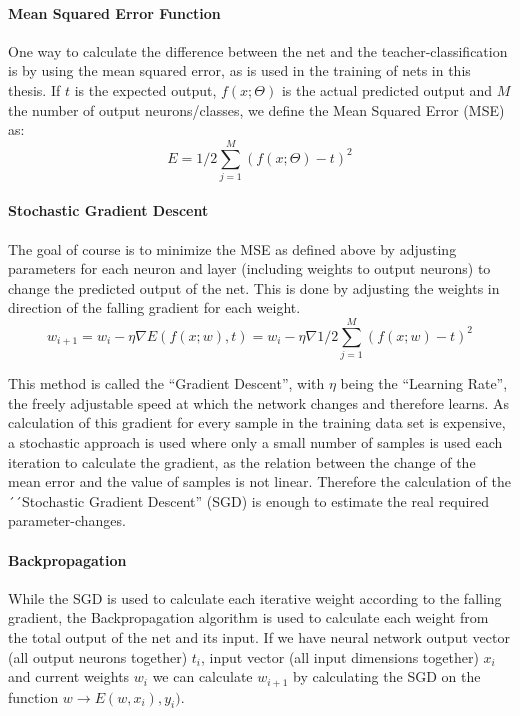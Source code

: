 \paragraph{Mean Squared Error Function}

One way to calculate the difference between the net and the teacher-classification is by using the mean squared error, as is used in the training of nets in this thesis. If \(t\) is the expected output, \(f(x;\Theta)\) is the actual predicted output and \(M\) the number of output neurons/classes, we define the Mean Squared Error (MSE) as:
\begin{equation}
E = 1 / 2 \sum_{j=1}^{M}(f(x;\Theta) - t)^2
\end{equation}

\paragraph{Stochastic Gradient Descent} The goal of course is to minimize the MSE as defined above by adjusting parameters for each neuron and layer (including weights to output neurons) to change the predicted output of the net.  This is done by adjusting the weights in direction of the falling gradient for each weight.
\begin{equation}
w_{i+1} = w_i - \eta \nabla E(f(x;w), t) = w_i - \eta \nabla 1/2\sum_{j=1}^M(f(x;w) - t)^2
\end {equation}

This method is called the ``Gradient Descent'', with \(\eta\) being the ``Learning Rate'', the freely adjustable speed at which the network changes and therefore learns. As calculation of this gradient for every sample in the training data set is expensive, a stochastic approach is used where only a small number of samples is used each iteration to calculate the gradient, as the relation between the change of the mean error and the value of samples is not linear. Therefore the calculation of the ´´Stochastic Gradient Descent'' (SGD) is enough to estimate the real required parameter-changes.

\paragraph{Backpropagation} While the SGD is used to calculate each iterative weight according to the falling gradient, the Backpropagation algorithm is used to calculate each weight from the total output of the net and its input. If we have neural network output vector (all output neurons together) \(t_i\), input vector (all input dimensions together) \(x_i\) and current weights \(w_i\) we can calculate \(w_{i+1}\) by calculating the SGD on the function \(w \rightarrow E(w, x_i), y_i)\).

